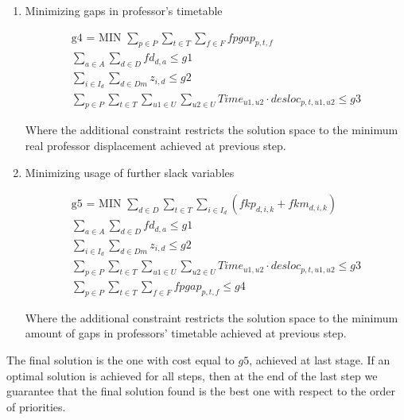 \begin{enumerate}
\item{Minimizing gaps in professor's timetable}

\begin{align*}
   \mbox{g4 = MIN  } \sum\limits_{p \in P} \sum\limits_{t \in T} \sum\limits_{f \in F} fpgap_{p,t,f}
	\\
	\sum\limits_{a \in A}\sum\limits_{d \in D} fd_{d,a} \le g1
	\\
	\sum\limits_{i \in I_{d}} \sum\limits_{d \in Dm} z_{i,d} \le g2
	\\
	\sum\limits_{p \in P} \sum\limits_{t \in T} \sum\limits_{u1 \in U} \sum\limits_{u2 \in U} Time_{u1,u2} \cdot desloc_{p,t,u1,u2} \le g3
\end{align*}

Where the additional constraint restricts the solution space to the minimum real professor displacement achieved at previous step.

\item{Minimizing usage of further slack variables}

\begin{align*}
   \mbox{g5 = MIN  } \sum\limits_{d \in D} \sum\limits_{t \in T} \sum\limits_{i \in I_{d}} (fkp_{d,i,k} + fkm_{d,i,k})
	\\
	\sum\limits_{a \in A}\sum\limits_{d \in D} fd_{d,a} \le g1
	\\
	\sum\limits_{i \in I_{d}} \sum\limits_{d \in Dm} z_{i,d} \le g2
	\\
	\sum\limits_{p \in P} \sum\limits_{t \in T} \sum\limits_{u1 \in U} \sum\limits_{u2 \in U} Time_{u1,u2} \cdot desloc_{p,t,u1,u2} \le g3
	\\
	\sum\limits_{p \in P} \sum\limits_{t \in T} \sum\limits_{f \in F} fpgap_{p,t,f} \le g4
\end{align*}

Where the additional constraint restricts the solution space to the minimum amount of gaps in professors' timetable achieved at previous step.

\end{enumerate}


The final solution is the one with cost equal to $g5$, achieved at last stage. If an optimal solution is achieved for all steps, then at the end of the last step we guarantee that the final solution found is the best one with respect to the order of priorities.

